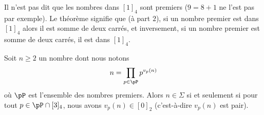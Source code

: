 \begin{remark}
	Il n'est pas dit que les nombres dans \( [1]_4\) sont premiers (\( 9=8+1\) ne l'est pas par exemple). Le théorème signifie que (à part \( 2\)), si un nombre premier est dans \( [1]_4\) alors il est somme de deux carrés, et inversement, si un nombre premier est somme de deux carrés, il est dans \( [1]_4\).
\end{remark}

\begin{theorem}
	Soit \( n\geq 2\) un nombre dont nous notons
	\begin{equation}    \label{EqBMHTzCT}
		n=\prod_{p\in\pP}p^{v_p(n)}
	\end{equation}
	où \( \pP\) est l'ensemble des nombres premiers. Alors \( n\in \Sigma\) si et seulement si pour tout \( p\in\pP\cap[3]_4\), nous avons \( v_p(n)\in [0]_2\) (c'est-à-dire \( v_p(n)\) est pair).
\end{theorem}

